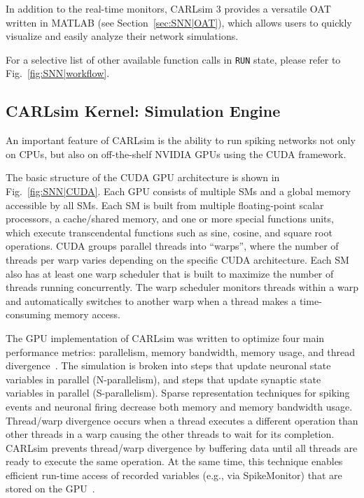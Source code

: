 In addition to the real-time monitors, CARLsim 3 provides a
versatile \ac{OAT} written in MATLAB (see Section~\ref{sec:SNN|OAT}),
which allows users to quickly
visualize and easily analyze their network simulations.

For a selective list of other available function calls in \texttt{RUN} 
state, please refer to Fig.~\ref{fig:SNN|workflow}.




\subsection{CARLsim Kernel: Simulation Engine}
\label{ch:SNN|kernel}
An important feature of CARLsim is the ability to run spiking
networks not only on \acp{CPU}, but also on off-the-shelf NVIDIA
\acp{GPU} using the \ac{CUDA} framework.

The basic structure of the CUDA GPU architecture is shown in
Fig.~\ref{fig:SNN|CUDA}.
Each \ac{GPU} consists of multiple \acp{SM}
and a global memory accessible by all \acp{SM}.
Each \ac{SM} is built from multiple floating-point scalar processors,
a cache/shared memory, and one or more special functions units,
which execute transcendental functions such as sine,
cosine, and square root operations. \ac{CUDA} groups parallel
threads into ``warps'', where the number of threads per warp
varies depending on the specific \ac{CUDA} architecture.
Each \ac{SM} also has at least one warp scheduler that is built to maximize
the number of threads running concurrently. The warp
scheduler monitors threads within a warp and automatically
switches to another warp when a thread makes a
time-consuming memory access.

The \ac{GPU} implementation of CARLsim was written to
optimize four main performance metrics: parallelism, memory
bandwidth, memory usage, and thread divergence~\citep{Nageswaran2009}.
The simulation is broken into steps that update neuronal state
variables in parallel (N-parallelism), and steps that update
synaptic state variables in parallel (S-parallelism). Sparse
representation techniques for spiking events and neuronal
firing decrease both memory and memory bandwidth usage.
Thread/warp divergence occurs when a thread
executes a different operation than other threads in a warp
causing the other threads to wait for its completion. CARLsim
prevents thread/warp divergence by buffering data until all
threads are ready to execute the same operation.
At the same time, this technique enables efficient run-time access
of recorded variables (e.g., via SpikeMonitor) that are stored on
the \ac{GPU}~\citep{Beyeler2015a}.

